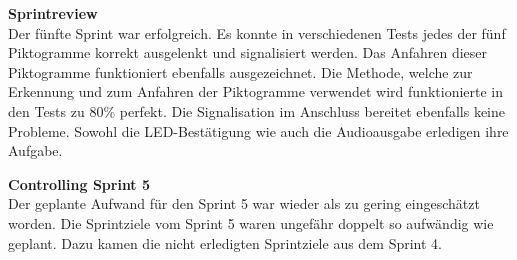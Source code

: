 \textbf{Sprintreview}\\
Der fünfte Sprint war erfolgreich. Es konnte in verschiedenen Tests jedes der fünf Piktogramme korrekt ausgelenkt und signalisiert werden.
Das Anfahren dieser Piktogramme funktioniert ebenfalls ausgezeichnet. Die Methode, welche zur Erkennung und zum Anfahren der Piktogramme verwendet wird funktionierte in den Tests zu 80\% perfekt. Die Signalisation im Anschluss bereitet ebenfalls keine Probleme. Sowohl die LED-Bestätigung wie auch die Audioausgabe erledigen ihre Aufgabe.

\textbf{Controlling Sprint 5}\\
Der geplante Aufwand für den Sprint 5 war wieder als zu gering eingeschätzt worden. Die Sprintziele vom Sprint 5 waren ungefähr doppelt so aufwändig wie geplant. Dazu kamen die nicht erledigten Sprintziele aus dem Sprint 4.











































